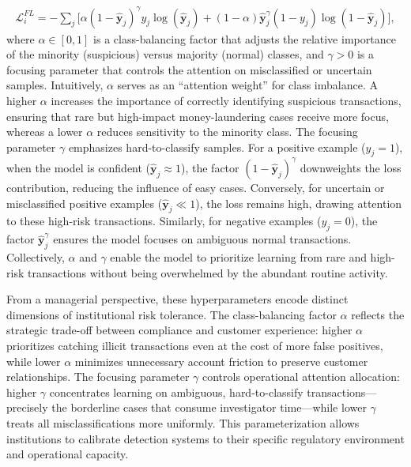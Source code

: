 \documentclass[11pt,english]{article}
\renewcommand{\hat}{\widehat}
\begin{document}
\begin{align}
\label{focal_loss}
    \mathcal{L}_i^{FL} = - \sum_j \big[\alpha(1 - \hat{\mathbf{y}}_j)^{\gamma} y_j \log(\hat{\mathbf{y}}_j) + (1-\alpha)\hat{\mathbf{y}}_j^{\gamma} (1-y_j) \log(1-\hat{\mathbf{y}}_j)\big],
\end{align}
where $\alpha \in [0,1]$ is a class-balancing factor that adjusts the relative importance of the minority (suspicious) versus majority (normal) classes, and $\gamma > 0$ is a focusing parameter that controls the attention on misclassified or uncertain samples. Intuitively, $\alpha$ serves as an ``attention weight'' for class imbalance. A higher $\alpha$ increases the importance of correctly identifying suspicious transactions, ensuring that rare but high-impact money-laundering cases receive more focus, whereas a lower $\alpha$ reduces sensitivity to the minority class. The focusing parameter $\gamma$ emphasizes hard-to-classify samples. For a positive example ($y_j = 1$), when the model is confident (\(\hat{\mathbf{y}}_j \approx 1\)), the factor $(1-\hat{\mathbf{y}}_j)^\gamma$ downweights the loss contribution, reducing the influence of easy cases. Conversely, for uncertain or misclassified positive examples (\(\hat{\mathbf{y}}_j \ll 1\)), the loss remains high, drawing attention to these high-risk transactions. Similarly, for negative examples ($y_j = 0$), the factor $\hat{\mathbf{y}}_j^\gamma$ ensures the model focuses on ambiguous normal transactions. Collectively, $\alpha$ and $\gamma$ enable the model to prioritize learning from rare and high-risk transactions without being overwhelmed by the abundant routine activity.

From a managerial perspective, these hyperparameters encode distinct dimensions of institutional risk tolerance. The class-balancing factor $\alpha$ reflects the strategic trade-off between compliance and customer experience: higher $\alpha$ prioritizes catching illicit transactions even at the cost of more false positives, while lower $\alpha$ minimizes unnecessary account friction to preserve customer relationships. The focusing parameter $\gamma$ controls operational attention allocation: higher $\gamma$ concentrates learning on ambiguous, hard-to-classify transactions—precisely the borderline cases that consume investigator time—while lower $\gamma$ treats all misclassifications more uniformly. This parameterization allows institutions to calibrate detection systems to their specific regulatory environment and operational capacity.
\end{document}
